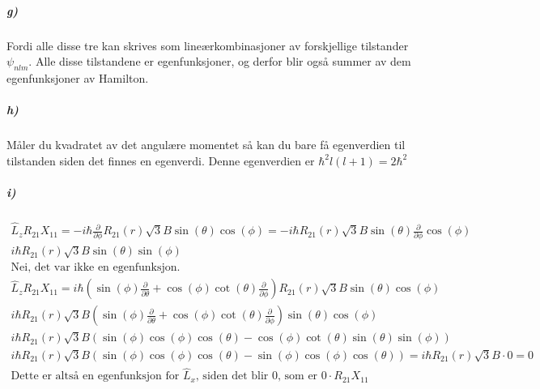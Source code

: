 \documentclass[11pt, A4paper,norsk]{article}
\begin{document}
			\subparagraph{g)}
				\begin{flushleft}
Fordi alle disse tre kan skrives som lineærkombinasjoner av forskjellige tilstander $\psi_{nlm}$. Alle disse tilstandene er egenfunksjoner, og derfor blir også summer av dem egenfunksjoner av Hamilton. 
				\end{flushleft}












			\subparagraph{h)}
				\begin{flushleft}
Måler du kvadratet av det angulære momentet så kan du bare få egenverdien til tilstanden siden det finnes en egenverdi. Denne egenverdien er $\hbar^2 l(l + 1) = 2 \hbar^2$
				\end{flushleft}










			\subparagraph{i)}
				\begin{gather*}
\hat{L}_z R_{21} X_{11} = - i \hbar \frac{\partial}{\partial \phi} R_{21}(r) \sqrt{3} B \sin(\theta) \cos(\phi) = - i \hbar R_{21}(r) \sqrt{3} B \sin(\theta) \frac{\partial}{\partial \phi} \cos(\phi) \\
i \hbar R_{21}(r) \sqrt{3} B \sin(\theta) \sin(\phi) \\
\text{Nei, det var ikke en egenfunksjon.} \\
\hat{L}_z R_{21} X_{11} = i \hbar \left( \sin(\phi) \frac{\partial}{\partial \theta} + \cos(\phi) \cot(\theta) \frac{\partial}{\partial \phi} \right) R_{21}(r) \sqrt{3} B \sin(\theta) \cos(\phi) \\
i \hbar R_{21}(r) \sqrt{3} B \left( \sin(\phi) \frac{\partial}{\partial \theta} + \cos(\phi) \cot(\theta) \frac{\partial}{\partial \phi} \right) \sin(\theta) \cos(\phi) \\
i \hbar R_{21}(r) \sqrt{3} B \left( \sin(\phi) \cos(\phi) \cos(\theta) - \cos(\phi) \cot(\theta) \sin(\theta) \sin(\phi) \right) \\
i \hbar R_{21}(r) \sqrt{3} B \left( \sin(\phi) \cos(\phi) \cos(\theta) - \sin(\phi) \cos(\phi) \cos(\theta) \right) = i \hbar R_{21}(r) \sqrt{3} B \cdot  0 = 0 \\
\text{Dette er altså en egenfunksjon for $\hat{L}_x$, siden det blir $0$, som er $0 \cdot R_{21}X_{11}$}
				\end{gather*}
\end{document}
